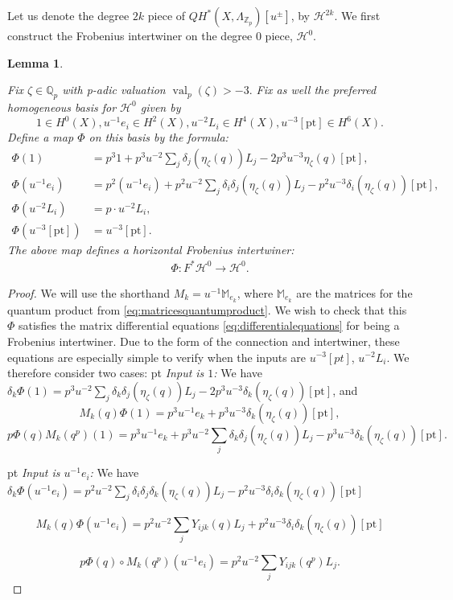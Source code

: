 \documentclass[reqno]{amsart}
\numberwithin{equation}{section}
\numberwithin{equation}{section}
\numberwithin{equation}{section}
\newtheorem{lemma}[thm]{Lemma}
\theoremstyle{definition}
\theoremstyle{remark}
\theoremstyle{remark}
\newcommand{\calH}{\mathcal{H}}
\begin{document}
Let us denote the degree $2k$ piece of $QH^{*}(X,\Lambda_{\mathbb{Z}_p})[u^\pm]$, by $\calH^{2k}.$ We first construct the Frobenius intertwiner on the degree $0$ piece, $\calH^0.$ 



\begin{lemma} \label{lem:integralityusingKSV} 

Fix $\zeta \in \mathbb{Q}_p$ with p-adic valuation $\operatorname{val}_p(\zeta)>-3.$ Fix as well the preferred homogeneous basis for $\calH^0$ given by $$1 \in H^0(X), u^{-1} e_i \in H^2(X), u^{-2}L_i \in H^4(X), u^{-3}[\mathrm{pt}] \in H^6(X).$$  Define a map $\Phi$ on this basis by the formula: 
\begin{align}
\Phi (1) &= p^3 1 +p^3 u^{-2} \sum_j\delta_j(\eta_\zeta (q)) L_j -2p^3 u^{-3} \eta_\zeta (q) [\mathrm{pt}], \\
\Phi (u^{-1}e_i) &= p^2 (u^{-1}e_i) + p^2 u^{-2}  \sum_j \delta_{i}\delta_{j}(\eta_\zeta(q))L_j -p^2 u^{-3}\delta_i(\eta_\zeta (q)) [\mathrm{pt}],\nonumber \\
\Phi (u^{-2}L_i) &= p \cdot u^{-2}L_i, \\
\Phi (u^{-3}[\mathrm{pt}])&=u^{-3}[\mathrm{pt}]. \nonumber  
\end{align}
The above map defines a horizontal Frobenius intertwiner: 
\begin{align}\label{eq:PhiH0} \Phi :  F^*\calH^0 \to \calH^0.\end{align} \end{lemma} 
\begin{proof} We will use the shorthand $M_k=u^{-1}\mathbb{M}_{e_k}$, where $\mathbb{M}_{e_k}$ are the matrices for the quantum product from \eqref{eq:matricesquantumproduct}. We wish to check that this $\Phi$ satisfies the matrix differential equations \eqref{eq:differentialequations} for being a Frobenius intertwiner. Due to the form of the connection and intertwiner, these equations are especially simple to verify when the inputs are $u^{-3}[pt]$, $u^{-2}L_i$. We therefore consider two cases:  pt
\emph{ Input is $1$:} We have $\delta_k \Phi (1) =  p^3u^{-2} \sum_j\delta_k\delta_j(\eta_\zeta(q)) L_j - 2p^3 u^{-3} \delta_k(\eta_\zeta(q)) [\mathrm{pt}]$, and   
$$M_k(q)\Phi(1)= p^3u^{-1} e_k+p^3 u^{-3}\delta_k(\eta_{\zeta}(q))[\mathrm{pt}],$$ 
$$ p\Phi(q) M_k(q^p)(1)= p^3 u^{-1}e_k+ p^3 u^{-2}\sum_j \delta_{k} \delta_j(\eta_{\zeta}(q))L_j - p^3 u^{-3}\delta_k(\eta_{\zeta}(q)) [\mathrm{pt}]. $$

  pt
\emph{Input is $u^{-1}e_i$:} 
We have $\delta_k \Phi (u^{-1}e_i)= p^2 u^{-2} \sum_j \delta_{i} \delta_j \delta_{k}(\eta_{\zeta}(q))L_j -p^2 u^{-3}\delta_{i} \delta_k (\eta_{\zeta}(q)) [\mathrm{pt}]$ 

$$M_k(q)\Phi(u^{-1}e_i)= p^2 u^{-2}\sum_j Y_{ijk}(q)L_j +p^2 u^{-3}\delta_{i} \delta_{k}(\eta_{\zeta}(q))[\mathrm{pt}]$$

$$p\Phi(q)\circ M_k(q^p)(u^{-1}e_i)= p^2u^{-2}\sum_j Y_{ijk}(q^p)L_j.$$
\end{proof}
\end{document}
